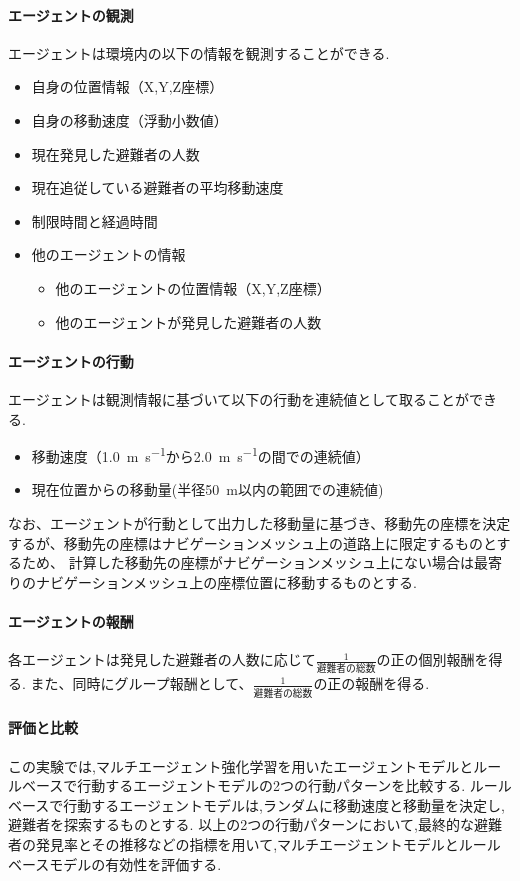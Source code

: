 \paragraph{エージェントの観測}
エージェントは環境内の以下の情報を観測することができる.
\begin{itemize}
  \item 自身の位置情報（X,Y,Z座標）
  \item 自身の移動速度（浮動小数値）
  \item 現在発見した避難者の人数
  \item 現在追従している避難者の平均移動速度
  \item 制限時間と経過時間
  \item 他のエージェントの情報
  \begin{itemize}
    \item 他のエージェントの位置情報（X,Y,Z座標）
    \item 他のエージェントが発見した避難者の人数
  \end{itemize} 
\end{itemize}

\paragraph{エージェントの行動}
エージェントは観測情報に基づいて以下の行動を連続値として取ることができる.
\begin{itemize}
  \item 移動速度（\SI{1.0}{\meter\per\second}から\SI{2.0}{\meter\per\second}の間での連続値）
  \item 現在位置からの移動量(半径\SI{50}{\meter}以内の範囲での連続値)
\end{itemize}
なお、エージェントが行動として出力した移動量に基づき、移動先の座標を決定するが、移動先の座標はナビゲーションメッシュ上の道路上に限定するものとするため、
計算した移動先の座標がナビゲーションメッシュ上にない場合は最寄りのナビゲーションメッシュ上の座標位置に移動するものとする.

\paragraph{エージェントの報酬}
各エージェントは発見した避難者の人数に応じて$\frac{1}{避難者の総数}$の正の個別報酬を得る.
また、同時にグループ報酬として、$\frac{1}{避難者の総数}$の正の報酬を得る.

\paragraph{評価と比較}
この実験では,マルチエージェント強化学習を用いたエージェントモデルとルールベースで行動するエージェントモデルの2つの行動パターンを比較する.
ルールベースで行動するエージェントモデルは,ランダムに移動速度と移動量を決定し,避難者を探索するものとする.
以上の2つの行動パターンにおいて,最終的な避難者の発見率とその推移などの指標を用いて,マルチエージェントモデルとルールベースモデルの有効性を評価する.

